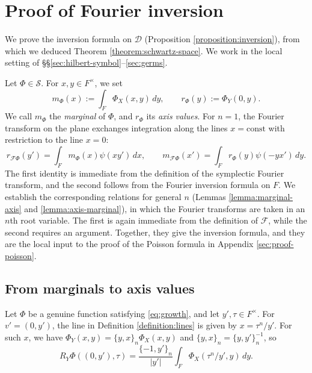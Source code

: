 \documentclass[reqno]{amsart}
\theoremstyle{plain}
\theoremstyle{definition}
\theoremstyle{itplain}
\numberwithin{equation}{section}
\numberwithin{theorem}{section}
\begin{document}
\appendix
\section{Proof of Fourier inversion}\label{sec:marginals}
We prove the inversion formula on $\mathcal{D}$ (Proposition \ref{proposition:inversion}), from which we deduced Theorem \ref{theorem:schwartz-space}.  We work in the local setting of \S\S\ref{sec:hilbert-symbol}--\ref{sec:germs}.

Let $\Phi \in \mathcal{S}$.  For $x, y \in F^\times$, we set
\begin{equation*}
  m_\Phi(x) := \int_F \Phi_X(x, y) \, d y,
  \qquad
  r_\Phi(y) := \Phi_Y(0, y).
\end{equation*}
We call $m_\Phi$ the \emph{marginal} of $\Phi$, and $r_\Phi$ its \emph{axis values}.  For $n = 1$, the Fourier transform on the plane exchanges integration along the lines $x = \mathrm{const}$ with restriction to the line $x = 0$:
\begin{equation*}
  r_{\mathcal{F} \Phi}(y') = \int_F m_\Phi(x) \psi(x y') \, d x,
  \qquad
  m_{\mathcal{F} \Phi}(x') = \int_F r_\Phi(y) \psi(- y x') \, d y.
\end{equation*}
The first identity is immediate from the definition of the symplectic Fourier transform, and the second follows from the Fourier inversion formula on $F$.  We establish the corresponding relations for general $n$ (Lemmas \ref{lemma:marginal-axis} and \ref{lemma:axis-marginal}), in which the Fourier transforms are taken in an $n$th root variable.  The first is again immediate from the definition of $\mathcal{F}$, while the second requires an argument.  Together, they give the inversion formula, and they are the local input to the proof of the Poisson formula in Appendix \ref{sec:proof-poisson}.

\subsection{From marginals to axis values}\label{sec:from-marginals-to-axis-values}
Let $\Phi$ be a genuine function satisfying \eqref{eq:growth}, and let $y', \tau \in F^\times$.  For $v' = (0, y')$, the line in Definition \ref{definition:lines} is given by $x = \tau^n / y'$.  For such $x$, we have $\Phi_Y(x, y) = \{y, x\}_n \Phi_X(x, y)$ and $\{y, x\}_n = \{y, y'\}_n^{-1}$, so
\begin{equation}\label{eq:axis-line-integral}
  R_Y \Phi((0, y'), \tau) = \frac{\{-1, y'\}_n}{\lvert y' \rvert} \int_F \Phi_X(\tau^n / y', y) \, d y.
\end{equation}
\end{document}
